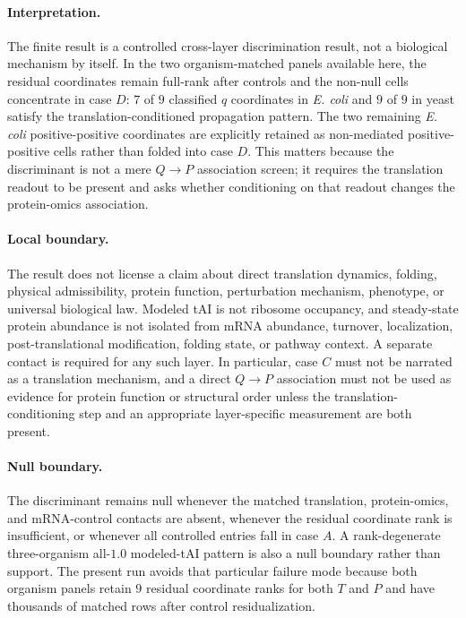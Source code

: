 \paragraph{Interpretation.}
The finite result is a controlled cross-layer discrimination result, not a biological mechanism by itself. In the two organism-matched panels available here, the residual coordinates remain full-rank after controls and the non-null cells concentrate in case $D$: $7$ of $9$ classified $q$ coordinates in \emph{E. coli} and $9$ of $9$ in yeast satisfy the translation-conditioned propagation pattern. The two remaining \emph{E. coli} positive-positive coordinates are explicitly retained as non-mediated positive-positive cells rather than folded into case $D$. This matters because the discriminant is not a mere $Q\to P$ association screen; it requires the translation readout to be present and asks whether conditioning on that readout changes the protein-omics association.

\paragraph{Local boundary.}
The result does not license a claim about direct translation dynamics, folding, physical admissibility, protein function, perturbation mechanism, phenotype, or universal biological law. Modeled tAI is not ribosome occupancy, and steady-state protein abundance is not isolated from mRNA abundance, turnover, localization, post-translational modification, folding state, or pathway context. A separate contact is required for any such layer. In particular, case $C$ must not be narrated as a translation mechanism, and a direct $Q\to P$ association must not be used as evidence for protein function or structural order unless the translation-conditioning step and an appropriate layer-specific measurement are both present.

\paragraph{Null boundary.}
The discriminant remains null whenever the matched translation, protein-omics, and mRNA-control contacts are absent, whenever the residual coordinate rank is insufficient, or whenever all controlled entries fall in case $A$. A rank-degenerate three-organism all-$1.0$ modeled-tAI pattern is also a null boundary rather than support. The present run avoids that particular failure mode because both organism panels retain $9$ residual coordinate ranks for both $T$ and $P$ and have thousands of matched rows after control residualization.
